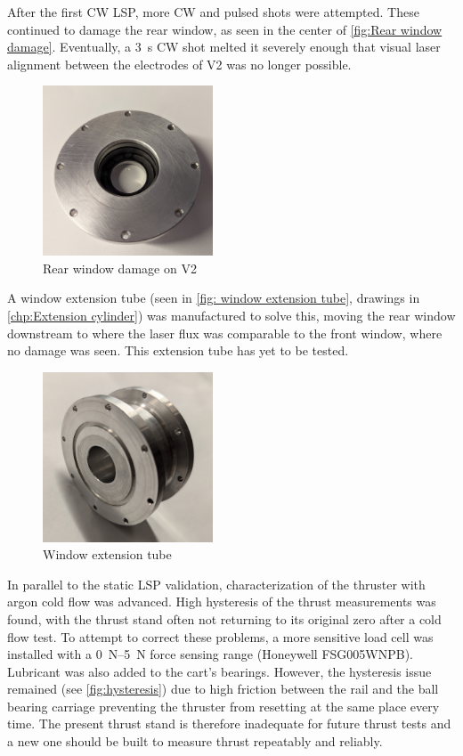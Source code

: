 After the first CW LSP, more CW and pulsed shots were attempted. These continued to damage the rear window, as seen in the center of \autoref{fig:Rear window damage}. Eventually, a \qty{3}{s} CW shot melted it severely enough that visual laser alignment between the electrodes of V2 was no longer possible.
\begin{figure}[!ht]
    \centering
    \includegraphics[width=0.45\textwidth]{assets/4 experiments/window damage.jpg}
    \caption{Rear window damage on V2}
    \label{fig:Rear window damage}
\end{figure}
A window extension tube (seen in \autoref{fig: window extension tube}, drawings in \autoref{chp:Extension cylinder}) was manufactured to solve this, moving the rear window downstream to where the laser flux was comparable to the front window, where no damage was seen. This extension tube has yet to be tested.
\begin{figure}[!ht]
    \centering
    \includegraphics[width=0.45\textwidth]{assets/5 discussion/Extension cylinder.jpg}
    \caption{Window extension tube}
    \label{fig: window extension tube}
\end{figure}

In parallel to the static LSP validation, characterization of the thruster with argon cold flow was advanced. High hysteresis of the thrust measurements was found, with the thrust stand often not returning to its original zero after a cold flow test. To attempt to correct these problems, a more sensitive load cell was installed with a \qtyrange{0}{5}{N} force sensing range (Honeywell FSG005WNPB). Lubricant was also added to the cart's bearings. However, the hysteresis issue remained (see \autoref{fig:hysteresis}) due to high friction between the rail and the ball bearing carriage preventing the thruster from resetting at the same place every time. The present thrust stand is therefore inadequate for future thrust tests and a new one should be built to measure thrust repeatably and reliably.


